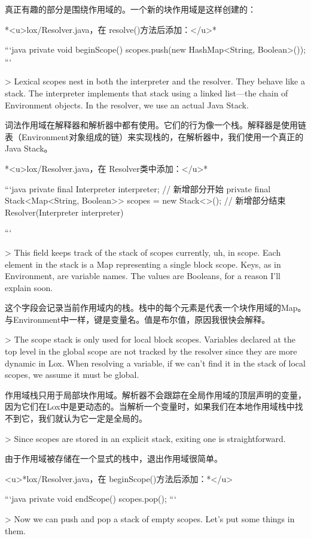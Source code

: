 \documentclass[cn,11pt,chinese]{elegantbook}
\begin{document}
{{{{{{{{{{{{真正有趣的部分是围绕作用域的。一个新的块作用域是这样创建的：

*<u>lox/Resolver.java，在 resolve()方法后添加：</u>*

```java
  private void beginScope() {
    scopes.push(new HashMap<String, Boolean>());
  }
```

> Lexical scopes nest in both the interpreter and the resolver. They behave like a stack. The interpreter implements that stack using a linked list—the chain of Environment objects. In the resolver, we use an actual Java Stack.

词法作用域在解释器和解析器中都有使用。它们的行为像一个栈。解释器是使用链表（Environment对象组成的链）来实现栈的，在解析器中，我们使用一个真正的Java Stack。

*<u>lox/Resolver.java，在 Resolver类中添加：</u>*

```java
  private final Interpreter interpreter;
  // 新增部分开始
  private final Stack<Map<String, Boolean>> scopes = new Stack<>();
  // 新增部分结束
  Resolver(Interpreter interpreter) {
```

> This field keeps track of the stack of scopes currently, uh, in scope. Each element in the stack is a Map representing a single block scope. Keys, as in Environment, are variable names. The values are Booleans, for a reason I’ll explain soon.

这个字段会记录当前作用域内的栈。栈中的每个元素是代表一个块作用域的Map。与Environment中一样，键是变量名。值是布尔值，原因我很快会解释。

> The scope stack is only used for local block scopes. Variables declared at the top level in the global scope are not tracked by the resolver since they are more dynamic in Lox. When resolving a variable, if we can’t find it in the stack of local scopes, we assume it must be global.

作用域栈只用于局部块作用域。解析器不会跟踪在全局作用域的顶层声明的变量，因为它们在Lox中是更动态的。当解析一个变量时，如果我们在本地作用域栈中找不到它，我们就认为它一定是全局的。

> Since scopes are stored in an explicit stack, exiting one is straightforward.

由于作用域被存储在一个显式的栈中，退出作用域很简单。

<u>*lox/Resolver.java，在 beginScope()方法后添加：*</u>

```java
  private void endScope() {
    scopes.pop();
  }
```

> Now we can push and pop a stack of empty scopes. Let’s put some things in them.

}}}}}}}}}}}}}
\end{document}
